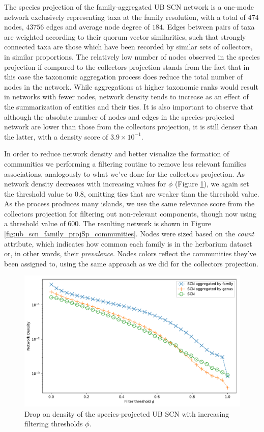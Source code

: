 The species projection of the family-aggregated UB SCN network is a one-mode network exclusively representing taxa at the family resolution, with a total of $474$ nodes, $43756$ edges and average node degree of $184$.
Edges between pairs of taxa are weighted according to their quorum vector similarities, such that strongly connected taxa are those which have been recorded by similar sets of collectors, in similar proportions.
%
The relatively low number of nodes observed in the species projection if compared to the collectors projection stands from the fact that in this case the taxonomic aggregation process does reduce the total number of nodes in the network.
While aggregations at higher taxonomic ranks would result in networks with fewer nodes, network density tends to increase as an effect of the summarization of entities and their ties.
%
It is also important to observe that although the absolute number of nodes and edges in the species-projected network are lower than those from the collectors projection, it is still denser than the latter, with a density score of $3.9 \times 10^{-1}$.

In order to reduce network density and better visualize the formation of communities we performing a filtering routine to remove less relevant families associations, analogously to what we've done for the collectors projection.
As network density decreases with increasing values for $\phi$ (Figure \ref{fig:ub_scn_projSp_filter_thresh}), we again set the threshold value to $0.8$, omitting ties that are weaker than the threshold value. 
As the process produces many islands, we use the same relevance score from the collectors projection for filtering out non-relevant components, though now using a threshold value of $600$.
The resulting network is shown in Figure \ref{fig:ub_scn_family_projSp_communities}.
Nodes were sized based on the \textit{count} attribute, which indicates how common each family is in the herbarium dataset or, in other words, their \textit{prevalence}. 
Nodes colors reflect the communities they've been assigned to, using the same approach as we did for the collectors projection.

\begin{figure}[!ht]
  	\centering
    \includegraphics[width=0.9\linewidth]{figures/casestudy_ub/scn_projSp_filter_thresh.pdf}
    \caption{ Drop on density of the species-projected UB SCN with increasing filtering thresholds $\phi$. }
    \label{fig:ub_scn_projSp_filter_thresh}
\end{figure}

